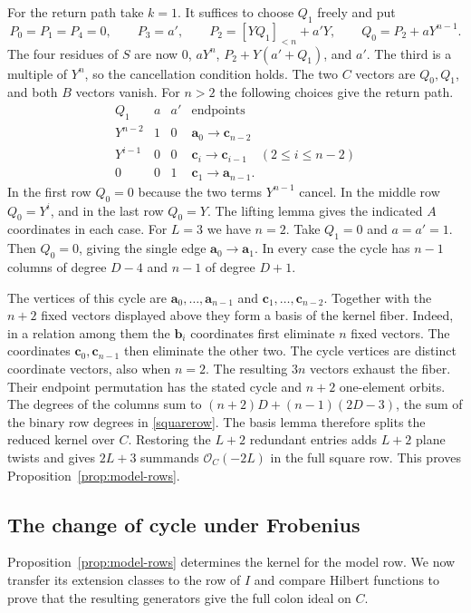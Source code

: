 \documentclass[11pt,a4paper,reqno]{amsart}
\numberwithin{equation}{section}
\theoremstyle{plain}
\newcommand{\OO}{\mathcal O}
\begin{document}
For the return path take $k=1$. It suffices to choose $Q_1$ freely and put
\[
 P_0=P_1=P_4=0,\qquad P_3=a',\qquad
 P_2=[YQ_1]_{<n}+a'Y,\qquad Q_0=P_2+aY^{n-1}.
\]
The four residues of $S$ are now $0$, $aY^n$, $P_2+Y(a'+Q_1)$, and $a'$. The third is a multiple of $Y^n$, so the cancellation condition holds. The two $C$ vectors are $Q_0,Q_1$, and both $B$ vectors vanish. For $n>2$ the following choices give the return path.
\[
\begin{array}{ccc|c}
 Q_1&a&a'&\text{endpoints}\\ \hline
 Y^{n-2}&1&0&\mathbf a_0\to\mathbf c_{n-2}\\
 Y^{i-1}&0&0&\mathbf c_i\to\mathbf c_{i-1}\quad(2\le i\le n-2)\\
 0&0&1&\mathbf c_1\to\mathbf a_{n-1}.
\end{array}
\]
In the first row $Q_0=0$ because the two terms $Y^{n-1}$ cancel. In the middle row $Q_0=Y^i$, and in the last row $Q_0=Y$. The lifting lemma gives the indicated $A$ coordinates in each case. For $L=3$ we have $n=2$. Take $Q_1=0$ and $a=a'=1$. Then $Q_0=0$, giving the single edge $\mathbf a_0\to\mathbf a_1$. In every case the cycle has $n-1$ columns of degree $D-4$ and $n-1$ of degree $D+1$.

The vertices of this cycle are $\mathbf a_0,\ldots,\mathbf a_{n-1}$ and $\mathbf c_1,\ldots,\mathbf c_{n-2}$. Together with the $n+2$ fixed vectors displayed above they form a basis of the kernel fiber. Indeed, in a relation among them the $\mathbf b_i$ coordinates first eliminate $n$ fixed vectors. The coordinates $\mathbf c_0,\mathbf c_{n-1}$ then eliminate the other two. The cycle vertices are distinct coordinate vectors, also when $n=2$. The resulting $3n$ vectors exhaust the fiber. Their endpoint permutation has the stated cycle and $n+2$ one-element orbits. The degrees of the columns sum to $(n+2)D+(n-1)(2D-3)$, the sum of the binary row degrees in \eqref{squarerow}. The basis lemma therefore splits the reduced kernel over $C$. Restoring the $L+2$ redundant entries adds $L+2$ plane twists and gives $2L+3$ summands $\OO_C(-2L)$ in the full square row. This proves Proposition~\ref{prop:model-rows}.

\subsection{The change of cycle under Frobenius}\label{sec:model}

Proposition~\ref{prop:model-rows} determines the kernel for the model row. We now transfer its extension classes to the row of $I$ and compare Hilbert functions to prove that the resulting generators give the full colon ideal on $C$.
\end{document}

